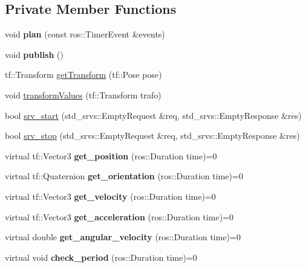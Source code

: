 \subsection*{Private Member Functions}
\begin{DoxyCompactItemize}
\item 
void {\bfseries plan} (const ros\+::\+Timer\+Event \&events)\hypertarget{classPlanner_a6ccd3cb4a24886ddeff615e665f2fbbd}{}\label{classPlanner_a6ccd3cb4a24886ddeff615e665f2fbbd}

\item 
void {\bfseries publish} ()\hypertarget{classPlanner_aa8937e0a808cebc224393438941515e4}{}\label{classPlanner_aa8937e0a808cebc224393438941515e4}

\item 
tf\+::\+Transform \hyperlink{classPlanner_ac5f9bfe3632ea59ffeafb53f51df6516}{get\+Transform} (tf\+::\+Pose pose)
\item 
void \hyperlink{classPlanner_aed84dce7b2e6e4e4408ac28f3069eb70}{transform\+Values} (tf\+::\+Transform trafo)
\item 
bool \hyperlink{classPlanner_a2a6a50634353cf10b7e4d0e1266c55b7}{srv\+\_\+start} (std\+\_\+srvs\+::\+Empty\+Request \&req, std\+\_\+srvs\+::\+Empty\+Response \&res)
\item 
bool \hyperlink{classPlanner_a65994104a9915ef59dd2360008bb24f0}{srv\+\_\+stop} (std\+\_\+srvs\+::\+Empty\+Request \&req, std\+\_\+srvs\+::\+Empty\+Response \&res)
\item 
virtual tf\+::\+Vector3 {\bfseries get\+\_\+position} (ros\+::\+Duration time)=0\hypertarget{classPlanner_ab388545a3fd2f37f70403d8484473a12}{}\label{classPlanner_ab388545a3fd2f37f70403d8484473a12}

\item 
virtual tf\+::\+Quaternion {\bfseries get\+\_\+orientation} (ros\+::\+Duration time)=0\hypertarget{classPlanner_a161fc00d031fd65914dae8f4b2edeffb}{}\label{classPlanner_a161fc00d031fd65914dae8f4b2edeffb}

\item 
virtual tf\+::\+Vector3 {\bfseries get\+\_\+velocity} (ros\+::\+Duration time)=0\hypertarget{classPlanner_a02af8b9ab29a19bd82c1cc35afcf2cc5}{}\label{classPlanner_a02af8b9ab29a19bd82c1cc35afcf2cc5}

\item 
virtual tf\+::\+Vector3 {\bfseries get\+\_\+acceleration} (ros\+::\+Duration time)=0\hypertarget{classPlanner_a123a163e7fe3a7547c784cbfd2bd398d}{}\label{classPlanner_a123a163e7fe3a7547c784cbfd2bd398d}

\item 
virtual double {\bfseries get\+\_\+angular\+\_\+velocity} (ros\+::\+Duration time)=0\hypertarget{classPlanner_ab5c6ec661acf83b1f095ba404dc4c958}{}\label{classPlanner_ab5c6ec661acf83b1f095ba404dc4c958}

\item 
virtual void {\bfseries check\+\_\+period} (ros\+::\+Duration time)=0\hypertarget{classPlanner_a1bc7f9ca05b5de8aa4c9ccda126c2be2}{}\label{classPlanner_a1bc7f9ca05b5de8aa4c9ccda126c2be2}

\end{DoxyCompactItemize}
